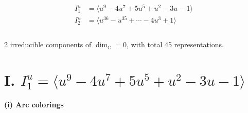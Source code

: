\documentclass[1p]{elsarticle_modified}
\theoremstyle{definition}
\begin{document}
\begin{align*}
I^u_{1}&=\langle 
u^9-4 u^7+5 u^5+u^2-3 u-1\rangle \\
I^u_{2}&=\langle 
u^{36}- u^{35}+\cdots-4 u^3+1\rangle \\
\\
\end{align*}
\raggedright * 2 irreducible components of $\dim_{\mathbb{C}}=0$, with total 45 representations.\\
\newpage
\renewcommand{\arraystretch}{1}
\centering \section*{I. $I^u_{1}= \langle u^9-4 u^7+5 u^5+u^2-3 u-1 \rangle$}
\flushleft \textbf{(i) Arc colorings}\\
\end{document}
